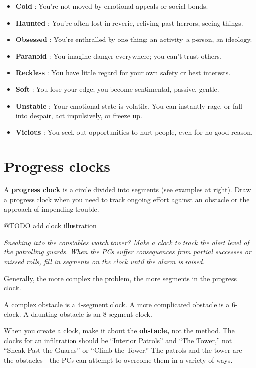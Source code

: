 \documentclass[11pt,fleqn,a5paper]{book}
\newcommand{\gameterm}[1]{\textbf{#1}}
\begin{document}
\begin{itemize}
	\item \gameterm{Cold} : You’re not moved by emotional appeals or social bonds.
	\item \gameterm{Haunted} : You’re often lost in reverie, reliving past horrors, seeing things.
	\item \gameterm{Obsessed} : You’re enthralled by one thing: an activity, a person, an ideology.
	\item \gameterm{Paranoid} : You imagine danger everywhere; you can’t trust others.
	\item \gameterm{Reckless} : You have little regard for your own safety or best interests.
	\item \gameterm{Soft} : You lose your edge; you become sentimental, passive, gentle.
	\item \gameterm{Unstable} : Your emotional state is volatile. You can instantly rage, or fall into despair, act impulsively, or freeze up.
	\item \gameterm{Vicious} : You seek out opportunities to hurt people, even for no good reason.
\end{itemize}

\chapter{Progress clocks}

A \textbf{progress clock} is a circle divided into segments (see examples at right). Draw a progress clock when you need to track ongoing effort against an obstacle or the approach of impending trouble.

@TODO add clock illustration

\emph{Sneaking into the constables watch tower? Make a clock to track the alert level of the patrolling guards. When the PCs suffer consequences from partial successes or missed rolls, fill in segments on the clock until the alarm is raised.}

Generally, the more complex the problem, the more segments in the progress clock.

A complex obstacle is a 4-segment clock. A more complicated obstacle is a 6-clock. A daunting obstacle is an 8-segment clock.

When you create a clock, make it about the \textbf{obstacle,} not the method. The clocks for an infiltration should be “Interior Patrols” and “The Tower,” not “Sneak Past the Guards” or “Climb the Tower.” The patrols and the tower are the obstacles---the PCs can attempt to overcome them in a variety of ways.
\end{document}
